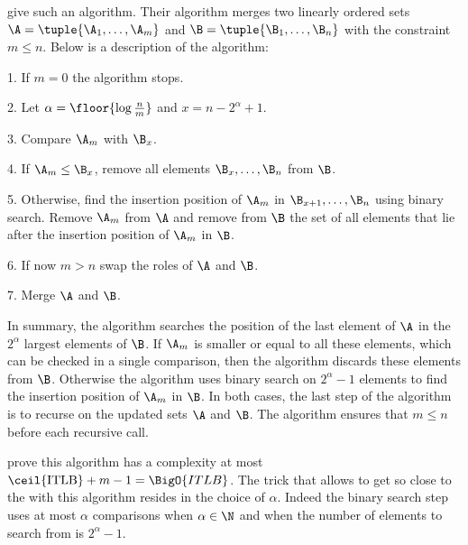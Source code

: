 \citet*{DBLP:journals/siamcomp/HwangL72} give such an algorithm. Their
algorithm merges two linearly ordered sets \(\A = \tuple{\A_1,\dots,\A_m}\) and
\(\B = \tuple{\B_1,\dots,\B_n}\) with the constraint \(m \le n\). Below is a
description of the algorithm:

\begin{algorithm}
\item[1.] If \(m = 0\) the algorithm stops.
\item[2.] Let \(\alpha = \floor{\log \frac{n}{m}}\) and \(x = n - 2^{\alpha} + 1\).
\item[3.] Compare \(\A_m\) with \(\B_x\).
\item[4.] If \(\A_m \le \B_x\), remove all elements \(\B_x,\dots,\B_n\) from
\(\B\).
\item[5.] Otherwise, find the insertion position of \(\A_m\) in
\(\B_{x+1},\dots,\B_{n}\) using binary search. Remove \(\A_m\) from \(\A\) and
remove from \(\B\) the set of all elements that lie after the insertion
position of \(\A_m\) in \(\B\).
\item[6.] If now \(m > n\) swap the roles of \(\A\) and \(\B\).
\item[7.] Merge \(\A\) and \(\B\).
\end{algorithm}

In summary, the algorithm searches the position of the last element of \(\A\)
in the \(2^{\alpha}\) largest elements of \(\B\). If \(\A_m\) is smaller or
equal to all these elements, which can be checked in a single comparison, then
the algorithm discards these elements from \(\B\). Otherwise the algorithm uses
binary search on \(2^{\alpha}-1\) elements to find the insertion position of
\(\A_m\) in \(\B\). In both cases, the last step of the algorithm is to recurse
on the updated sets \(\A\) and \(\B\). The algorithm ensures that \(m \le n\)
before each recursive call.

\citet*{DBLP:journals/siamcomp/HwangL72} prove this algorithm has a complexity
at most \(\ceil{\text{ITLB}} + m - 1 = \BigO{ITLB}\). The trick that allows to
get so close to the  with this algorithm resides in the choice of
\(\alpha\). Indeed the binary search step uses at most \(\alpha\) comparisons
when \(\alpha \in \N\) and when the number of elements to search
from is \(2^{\alpha}-1\).

